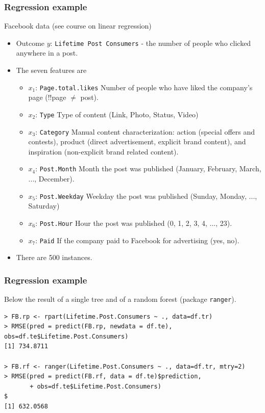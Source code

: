 \begin{frame}
\frametitle{Regression example}
Facebook data (see course on linear regression)
\begin{itemize}
\item Outcome $y$: {\tt Lifetime Post Consumers} - the number of people who clicked anywhere in a post.
\item The seven features are 
\begin{itemize}
\scriptsize
\item $x_1$: {\tt Page.total.likes} Number of people who have liked the company's page (!!page $\neq$ post).
\item $x_2$: {\tt Type} Type of content (Link, Photo, Status, Video)
\item $x_3$: {\tt Category} Manual content characterization: action (special offers and contests), product (direct advertisement, explicit brand content), and inspiration (non-explicit brand related content).
\item $x_4$: {\tt Post.Month} Month the post was published (January, February, March, ...,
December).
\item $x_5$: {\tt Post.Weekday} Weekday the post was published (Sunday, Monday, ...,
Saturday)
\item $x_6$: {\tt Post.Hour} Hour the post was published (0, 1, 2, 3, 4, ..., 23).
\item $x_7$: {\tt Paid} If the company paid to Facebook for advertising (yes, no).
\end{itemize}
\item There are 500 instances.
\end{itemize}
\end{frame}
\begin{frame}[fragile]
\frametitle{Regression example}
Below the result of a single tree and of a random forest (package {\tt ranger}).
\scriptsize
\begin{verbatim}
> FB.rp <- rpart(Lifetime.Post.Consumers ~ ., data=df.tr)
> RMSE(pred = predict(FB.rp, newdata = df.te), obs=df.te$Lifetime.Post.Consumers)
[1] 734.8711

> FB.rf <- ranger(Lifetime.Post.Consumers ~ ., data=df.tr, mtry=2)
> RMSE(pred = predict(FB.rf, data = df.te)$prediction, 
       + obs=df.te$Lifetime.Post.Consumers)                                                        $
[1] 632.0568
\end{verbatim}
\normalsize
\end{frame}

